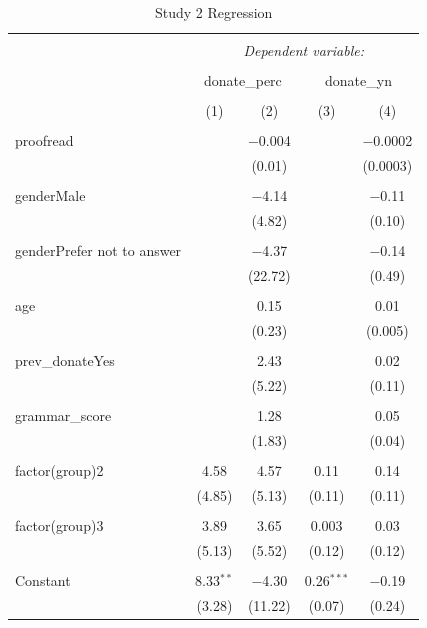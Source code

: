 \documentclass[]{article}
\begin{document}
\begin{table}[!htbp] \centering 
  \caption{Study 2 Regression} 
  \label{} 
\begin{tabular}{@{\extracolsep{5pt}}lcccc} 
\\[-1.8ex]\hline 
\hline \\[-1.8ex] 
 & \multicolumn{4}{c}{\textit{Dependent variable:}} \\ 
\cline{2-5} 
\\[-1.8ex] & \multicolumn{2}{c}{donate\_perc} & \multicolumn{2}{c}{donate\_yn} \\ 
\\[-1.8ex] & (1) & (2) & (3) & (4)\\ 
\hline \\[-1.8ex] 
 proofread &  & $-$0.004 &  & $-$0.0002 \\ 
  &  & (0.01) &  & (0.0003) \\ 
  & & & & \\ 
 genderMale &  & $-$4.14 &  & $-$0.11 \\ 
  &  & (4.82) &  & (0.10) \\ 
  & & & & \\ 
 genderPrefer not to answer &  & $-$4.37 &  & $-$0.14 \\ 
  &  & (22.72) &  & (0.49) \\ 
  & & & & \\ 
 age &  & 0.15 &  & 0.01 \\ 
  &  & (0.23) &  & (0.005) \\ 
  & & & & \\ 
 prev\_donateYes &  & 2.43 &  & 0.02 \\ 
  &  & (5.22) &  & (0.11) \\ 
  & & & & \\ 
 grammar\_score &  & 1.28 &  & 0.05 \\ 
  &  & (1.83) &  & (0.04) \\ 
  & & & & \\ 
 factor(group)2 & 4.58 & 4.57 & 0.11 & 0.14 \\ 
  & (4.85) & (5.13) & (0.11) & (0.11) \\ 
  & & & & \\ 
 factor(group)3 & 3.89 & 3.65 & 0.003 & 0.03 \\ 
  & (5.13) & (5.52) & (0.12) & (0.12) \\ 
  & & & & \\ 
 Constant & 8.33$^{**}$ & $-$4.30 & 0.26$^{***}$ & $-$0.19 \\ 
  & (3.28) & (11.22) & (0.07) & (0.24) \\ 

\end{tabular}
\end{table}
\end{document}
